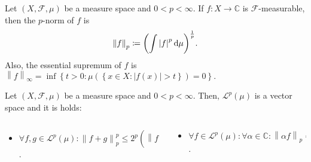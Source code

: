 \begin{frame}
	\begin{definition}
		Let $\left(X,\mathcal{F},\mu\right)$ be a measure space and
		$0<p<\infty$.
		If $f\colon X\to\mathds{C}$ is $\mathcal{F}$-measurable, then
		the \alert{$p$-norm} of $f$ is
		\begin{equation*}
			{\left\|f\right\|}_{p}\coloneqq
			{\left(
				\int{\left|f\right|}^{p}\dl\mu
				\right)}^{\frac{1}{p}}.
		\end{equation*}
		Also, the \alert{essential supremum} of $f$ is
		\begin{math}
			{\left\|f\right\|}_{\infty}=
			\inf
			\left\{
			t>0:
			\mu\left(
			\left\{x\in X:\left|f\left(x\right)\right|>t\right\}
			\right)=0
			\right\}.
		\end{math}
	\end{definition}

	\begin{theorem}
		Let $\left(X,\mathcal{F},\mu\right)$ be a measure space and
		$0<p<\infty$.
		Then,
		\alert{$\mathcal{L}^{p}\left(\mu\right)$ is a vector space}
		and it is holds:
		\begin{columns}
			\begin{column}{0.48\textwidth}
				\begin{itemize}
					\item

					      \begin{math}
						      \forall f,g\in\mathcal{L}^{p}\left(\mu\right):
						      {\left\|f+g\right\|}^{p}_{p}\leq
						      2^{p}
						      \left(
						      {\left\|f\right\|}^{p}_{p}+
						      {\left\|g\right\|}^{p}_{p}
						      \right)
					      \end{math}.
				\end{itemize}
			\end{column}
			\begin{column}{0.48\textwidth}
				\begin{itemize}
					\item

					      \begin{math}
						      \forall f\in\mathcal{L}^{p}\left(\mu\right):
						      \forall\alpha\in\mathds{C}:
						      {\left\|\alpha f\right\|}_{p}=
						      \left|\alpha\right|
						      {\left\|f\right\|}_{p}
					      \end{math}.

				\end{itemize}
			\end{column}
		\end{columns}
	\end{theorem}


\end{frame}
